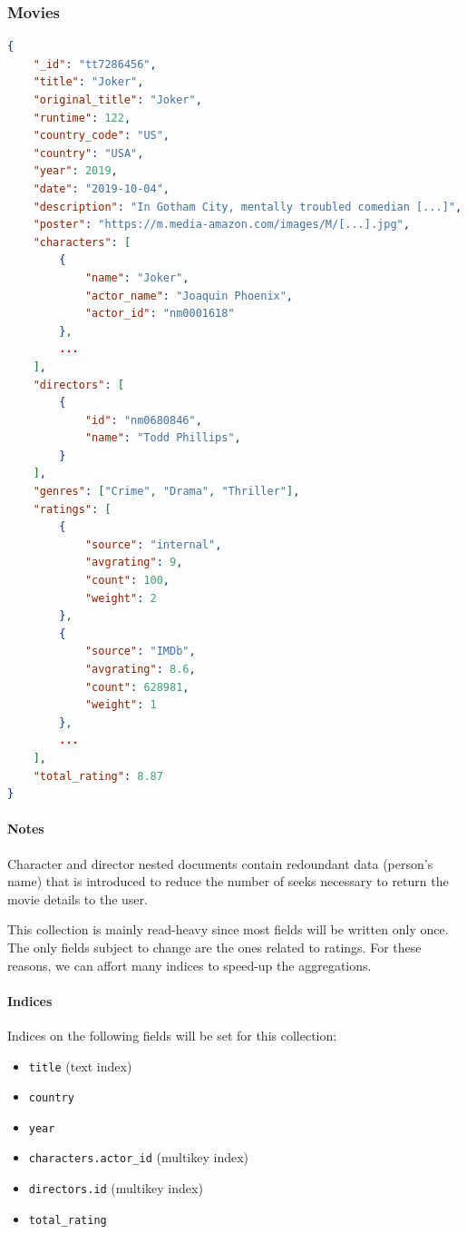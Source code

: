 \documentclass[11pt]{article}
\begin{document}
\subsubsection{Movies}
\label{sec:movies}

\begin{lstlisting}[language=json]	
{
	"_id": "tt7286456",
	"title": "Joker",
	"original_title": "Joker",
	"runtime": 122,
	"country_code": "US",
	"country": "USA",
	"year": 2019,
	"date": "2019-10-04",
	"description": "In Gotham City, mentally troubled comedian [...]",
	"poster": "https://m.media-amazon.com/images/M/[...].jpg",
	"characters": [
		{
			"name": "Joker",
			"actor_name": "Joaquin Phoenix",
			"actor_id": "nm0001618"
		},
		...
	],
	"directors": [
		{
			"id": "nm0680846",
			"name": "Todd Phillips",
		}
	],
	"genres": ["Crime", "Drama", "Thriller"],
	"ratings": [
		{
			"source": "internal",
			"avgrating": 9,
			"count": 100,
			"weight": 2
		},
		{
			"source": "IMDb",
			"avgrating": 8.6,
			"count": 628981,
			"weight": 1
		},
		...
	],
	"total_rating": 8.87
}
\end{lstlisting}

\paragraph{Notes}
Character and director nested documents contain redoundant data (person's name) that is introduced to reduce the number of seeks necessary to return the movie details
to the user.

This collection is mainly read-heavy since most fields will be written only once.
The only fields subject to change are the ones related to ratings. For these reasons,
we can affort many indices to speed-up the aggregations.

\paragraph{Indices} 
Indices on the following fields will be set for this collection:
\begin{itemize}
	\item \texttt{title} (text index)
	\item \texttt{country}
	\item \texttt{year}
	\item \texttt{characters.actor\_id} (multikey index)
	\item \texttt{directors.id} (multikey index)
	\item \texttt{total\_rating}
\end{itemize}
\end{document}

